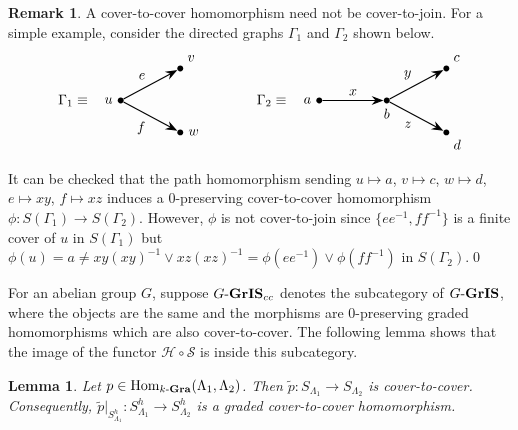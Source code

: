 \documentclass[a4paper,reqno,11pt]{amsart}
\numberwithin{equation}{section}
\newtheorem{lem}[thm]{Lemma}
\theoremstyle{definition}
\newtheorem{rmk}[thm]{Remark}
\theoremstyle{remark}
\newcommand{\Hom}{\operatorname{Hom}}
\begin{document}
\begin{rmk}\label{rem cover-to-cover but not cover-to-join}
A cover-to-cover homomorphism need not be cover-to-join. For a simple example, consider the directed graphs $\Gamma_1$ and $\Gamma_2$ shown below. 
\[
\begin{tikzpicture}[
    >={Stealth[length=3mm]},
    vertex/.style={circle, fill=black, inner sep=1.5pt},
    edge/.style={->, thick},
    every node/.style={font=\large}
]

\node[vertex, label=left:\normalsize{$u$}] (u) at (0,0) {};
\node[vertex, label=above right:\normalsize{$v$}] (v) at (1.5,0.8) {};
\node[vertex, label=right:\normalsize{$w$}] (w) at (1.5,-0.8) {};

\draw[edge] (u) -- node[above left] {\normalsize{$e$}} (v);
\draw[edge] (u) -- node[below left] {\normalsize{$f$}} (w);

\node[vertex, label=left:\normalsize{$a$}] (a) at (5,0) {};
\node[vertex, label=below:\normalsize{$b$}] (b) at (6.7,0) {};
\node[vertex, label=above right:\normalsize{$c$}] (c) at (8.2,0.8) {};
\node[vertex, label=below right:\normalsize{$d$}] (d) at (8.2,-0.8) {};

\draw[edge] (a) -- node[above] {\normalsize{$x$}} (b);
\draw[edge] (b) -- node[above left] {\normalsize{$y$}} (c);
\draw[edge] (b) -- node[below left] {\normalsize{$z$}} (d);

\node[] at (-1.2,0) {\normalsize{$\Gamma_1\equiv$}};
\node[] at (3.8,0) {\normalsize{$\Gamma_2\equiv$}};

\end{tikzpicture}
\]
It can be checked that the path homomorphism sending $u\mapsto a$, $v\mapsto c$, $w\mapsto d$, $e\mapsto xy$, $f\mapsto xz$ induces a $0$-preserving cover-to-cover homomorphism $\phi:S(\Gamma_1)\longrightarrow S(\Gamma_2)$. However, $\phi$ is not cover-to-join since $\{ee^{-1},ff^{-1}\}$ is a finite cover of $u$ in $S(\Gamma_1)$ but $\phi(u)=a\neq xy(xy)^{-1} \vee xz(xz)^{-1}=\phi(ee^{-1})\vee \phi(ff^{-1})$ in $S(\Gamma_2)$.\qed  
\end{rmk}
For an abelian group $G$, suppose $G\textup{-\textbf{GrIS}}_{cc}$ denotes the subcategory of $G\textup{-\textbf{GrIS}}$, where the objects are the same and the morphisms are $0$-preserving graded homomorphisms which are also cover-to-cover. The following lemma shows that the image of the functor $\mathcal{H}\circ \mathcal{S}$ is inside this subcategory.
\begin{lem}\label{lem the induced homomorphism is cover-to-cover}
Let $p\in \Hom_{k\textup{-\textbf{Gra}}}(\Lambda_1,\Lambda_2)$. Then $\tilde{p}:S_{\Lambda_1}\longrightarrow S_{\Lambda_2}$ is cover-to-cover. Consequently, $\tilde{p}|_{S_{\Lambda_1}^h}:S_{\Lambda_1}^h\longrightarrow S_{\Lambda_2}^h$ is a graded cover-to-cover homomorphism.   
\end{lem}
\end{document}
